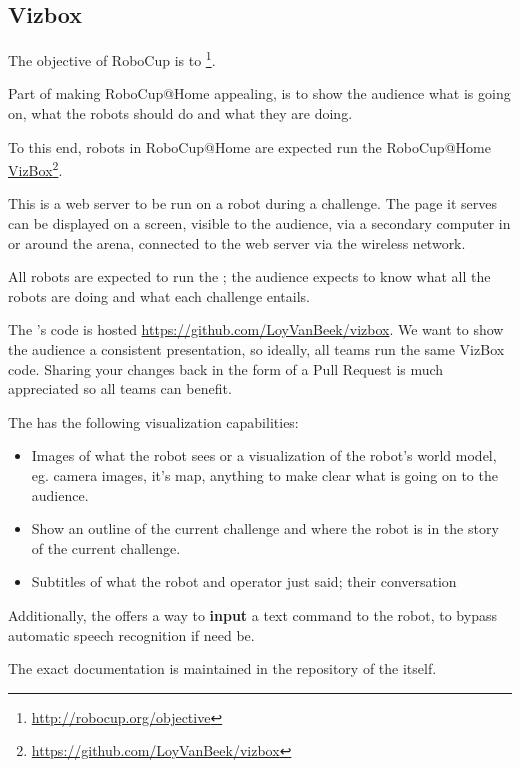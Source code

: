 \subsection{Vizbox}
\label{vizbox}

The objective of RoboCup is to  \footnote{\url{http://robocup.org/objective}}.

Part of making RoboCup@Home appealing, is to show the audience what is going on, what the robots should do and what they are doing.

To this end, robots in RoboCup@Home are expected run the RoboCup@Home \href{https://github.com/LoyVanBeek/vizbox}{VizBox}\footnote{\url{https://github.com/LoyVanBeek/vizbox}}.

This is a web server to be run on a robot during a challenge. The page it serves can be displayed on a screen, visible to the audience, via a secondary computer in or around the arena, connected to the web server via the wireless network.

All robots are expected to run the ; the audience expects to know what all the robots are doing and what each challenge entails.

The 's code is hosted \url{https://github.com/LoyVanBeek/vizbox}.
We want to show the audience a consistent presentation, so ideally, all teams run the same VizBox code.
Sharing your changes back in the form of a Pull Request is much appreciated so all teams can benefit.

The  has the following visualization capabilities:
\begin{itemize}
	\item Images of what the robot sees or a visualization of the robot's world model, eg. camera images, it's map, anything to make clear what is going on to the audience.
	\item Show an outline of the current challenge and where the robot is in the story of the current challenge.
	\item Subtitles of what the robot and operator just said; their conversation
\end{itemize}

Additionally, the  offers a way to \textbf{input} a text command to the robot, to bypass automatic speech recognition if need be.

The exact documentation is maintained in the repository of the  itself.